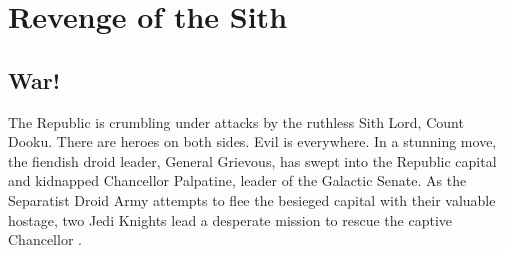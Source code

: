 \chapter{Revenge of the Sith}	
\section{War!}
The Republic is crumbling under attacks by the ruthless Sith 
Lord, Count Dooku. There are heroes on both sides. Evil is 
everywhere. In a stunning move, the fiendish droid leader, 
General Grievous, has swept into the Republic capital and 
kidnapped Chancellor Palpatine, leader of the Galactic Senate. 
As the Separatist Droid Army attempts to flee the besieged 
capital with their valuable hostage, two Jedi Knights lead 
a desperate mission to rescue the captive Chancellor \cite{bib_obiwan05, bib_anakin05, bib_padme05, bib_yoda05, bib_vader05}.

\lipsum[1-10]
